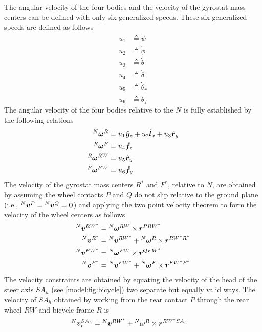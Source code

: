 The angular velocity of the four bodies and the velocity of the gyrostat mass
centers can be defined with only six generalized speeds. These six generalized
speeds are defined as follows
\begin{align}
  u_{1} &\triangleq \dot{\psi} \\
  u_{2} &\triangleq \dot{\phi} \\
  u_{3} &\triangleq \dot{\theta} \\
  u_{4} &\triangleq \dot{\delta} \\
  u_{5} &\triangleq \dot{\theta}_r \\
  u_{6} &\triangleq \dot{\theta}_f
\end{align}
The angular velocity of the four bodies relative to the $N$ is fully
established by the following relations
\begin{align}
  {}^{N}\boldsymbol{\omega}^{R} &= u_1 \hat{\boldsymbol{y}}_{z} + u_2 \hat{\boldsymbol{l}}_{x} + u_3\hat{\boldsymbol{r}}_{y} \\
  {}^{R}\boldsymbol{\omega}^{F} &= u_4 \hat{\boldsymbol{f}}_{z} \\
  {}^{R}\boldsymbol{\omega}^{RW} &= u_5 \hat{\boldsymbol{r}}_{y} \\
  {}^{F}\boldsymbol{\omega}^{FW} &= u_6 \hat{\boldsymbol{f}}_{y}
\end{align}
The velocity of the gyrostat mass centers $R^*$ and $F^*$, relative to $N$, are
obtained by assuming the wheel contacts $P$ and $Q$ do not slip relative to the
ground plane (i.e., ${}^{N}\boldsymbol{v}^{P} = {}^{N}\boldsymbol{v}^{Q} = \boldsymbol{0}$) and applying the two
point velocity theorem to form the velocity of the wheel centers as follows
\begin{align}
  {}^{N}\boldsymbol{v}^{RW^*} &= {}^{N}\boldsymbol{\omega}^{RW} \times \boldsymbol{r}^{PRW^*} \\
  {}^{N}\boldsymbol{v}^{R^*} &= {}^{N}\boldsymbol{v}^{RW^*} + {}^{N}\boldsymbol{\omega}^{R} \times \boldsymbol{r}^{RW^*R^*} \\
  {}^{N}\boldsymbol{v}^{FW^*} &= {}^{N}\boldsymbol{\omega}^{FW} \times \boldsymbol{r}^{QFW^*} \\
  {}^{N}\boldsymbol{v}^{F^*} &= {}^{N}\boldsymbol{v}^{FW^*} + {}^{N}\boldsymbol{\omega}^{F} \times \boldsymbol{r}^{FW^*F^*}
\end{align}
The velocity constraints are obtained by equating the velocity of the head of
the steer axis $SA_h$ (see \autoref{model:fig:bicycle}) two separate but
equally valid ways. The velocity of $SA_h$ obtained by working from the rear
contact $P$ through the rear wheel $RW$ and bicycle frame $R$ is
\begin{align}
  {}^{N}\boldsymbol{v}^{SA_h}_r &= {}^{N}\boldsymbol{v}^{RW^*} + {}^{N}\boldsymbol{\omega}^{R} \times \boldsymbol{r}^{RW^*SA_h}
\end{align}
